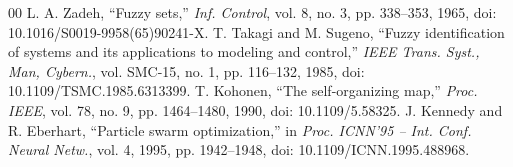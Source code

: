 \documentclass[conference]{IEEEtran}
\begin{document}
\begin{thebibliography}{00}
 L. A. Zadeh, ``Fuzzy sets,'' \emph{Inf. Control}, vol. 8, no. 3, pp. 338--353, 1965, doi: 10.1016/S0019-9958(65)90241-X.
 T. Takagi and M. Sugeno, ``Fuzzy identification of systems and its applications to modeling and control,'' \emph{IEEE Trans. Syst., Man, Cybern.}, vol. SMC-15, no. 1, pp. 116--132, 1985, doi: 10.1109/TSMC.1985.6313399.
 T. Kohonen, ``The self-organizing map,'' \emph{Proc. IEEE}, vol. 78, no. 9, pp. 1464--1480, 1990, doi: 10.1109/5.58325.
 J. Kennedy and R. Eberhart, ``Particle swarm optimization,'' in \emph{Proc. ICNN'95 -- Int. Conf. Neural Netw.}, vol. 4, 1995, pp. 1942--1948, doi: 10.1109/ICNN.1995.488968.
\end{thebibliography}
\end{document}
